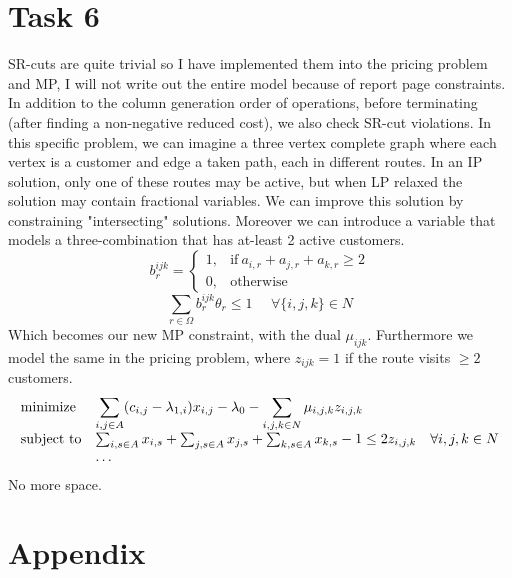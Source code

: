 \documentclass{article}
\begin{document}
    \section{Task 6}
    SR-cuts are quite trivial so I have implemented them into the pricing problem and MP, I will not write out the entire model because of report page constraints.
    In addition to the column generation order of operations, before terminating (after finding a non-negative reduced cost), we also check SR-cut violations.
    In this specific problem, we can imagine a three vertex complete graph where each vertex is a customer and edge a taken path, each in different routes.
    In an IP solution, only one of these routes may be active, but when LP relaxed the solution may contain fractional variables.
    We can improve this solution by constraining "intersecting" solutions.
    Moreover we can introduce a variable that models a three-combination that has at-least 2 active customers.
    \[
        b_r^{ijk} =     \begin{cases}
                            1, & \text{if}\ a_{i,r} + a_{j,r} + a_{k,r} \geq 2 \\
                            0, & \text{otherwise}
        \end{cases}
    \]
    \[
        \sum_{r \in \Omega} b_r^{ijk} \theta_r \leq 1 \,\,\,\,\,\,\,\, \forall \{ i,j,k \} \in N
    \]
    Which becomes our new MP constraint, with the dual $\mu_{ijk}$.
    Furthermore we model the same in the pricing problem, where $z_{ijk} = 1$ if the route visits $\geq 2$ customers.
    \begin{equation*}
        \begin{array}{ll@{}ll}
            \text{minimize}  & \displaystyle\sum_{i,j \in A} ( c_{i, j} - \lambda_{1,i})x_{i,j} - \lambda_0 - \sum_{i,j,k \in N} \mu_{i,j,k} z_{i,j,k}&&\\
            \text{subject to}& \sum_{i,s \in A} x_{i,s} + \sum_{j,s \in A} x_{j,s} + \sum_{k,s \in A} x_{k,s} - 1 \leq 2 z_{i,j,k} &&\forall i,j,k \in N\\
            & \dots &&\\
        \end{array}
    \end{equation*}
    No more space.

    \clearpage
    \section{Appendix}
\end{document}
